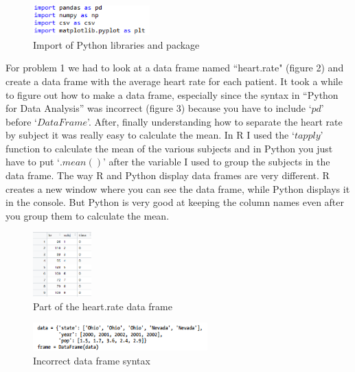 \documentclass{article}
\begin{document}
\begin{figure}[h]
\begin{center}
\includegraphics[width=0.4\textwidth]{import.png}
\end{center}
\caption{Import of Python libraries and package}
\end{figure}

\newpage

\indent For problem 1 we had to look at a data frame named ``heart.rate" (figure 2) and create a data frame with the average heart rate for each patient. It took a while to figure out how to make a data frame, especially since the syntax in “Python for Data Analysis” was incorrect (figure 3) because you have to include `$pd$' before `$DataFrame$'. After, finally understanding how to separate the heart rate by subject it was really easy to calculate the mean. In R I used the `$tapply$' function to calculate the mean of the various subjects and in Python you just have to put `$.mean()$' after the variable I used to group the subjects in the data frame. The way R and Python display data frames are very different. R creates a new window where you can see the data frame, while Python displays it in the console. But Python is very good at keeping the column names even after you group them to calculate the mean.


\begin{figure}[h]
\begin{center}
\includegraphics[width=0.2\textwidth]{heartratedata.png}
\end{center}
\caption{Part of the heart.rate data frame}
\end{figure}

\begin{figure}[h]
\begin{center}
\includegraphics[width=0.6\textwidth]{dataframe.png}
\end{center}
\caption{Incorrect data frame syntax}
\end{figure}
\end{document}
